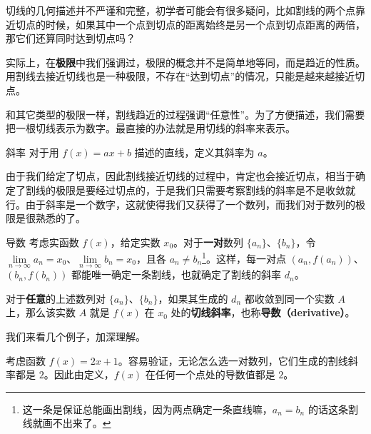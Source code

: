 



切线的几何描述并不严谨和完整，初学者可能会有很多疑问，比如割线的两个点靠近切点的时候，如果其中一个点到切点的距离始终是另一个点到切点距离的两倍，那它们还算同时达到切点吗？

实际上，在\textbf{极限}中我们强调过，极限的概念并不是简单地等同，而是趋近的性质。用割线去接近切线也是一种极限，不存在“达到切点”的情况，只能是越来越接近切点。

和其它类型的极限一样，割线趋近的过程强调“任意性”。为了方便描述，我们需要把一根切线表示为数字。最直接的办法就是用切线的斜率来表示。

\begin{definition}{斜率}
对于用 $f(x)=ax+b$ 描述的直线，定义其斜率为 $a$。
\end{definition}

由于我们给定了切点，因此割线接近切线的过程中，肯定也会接近切点，相当于确定了割线的极限是要经过切点的，于是我们只需要考察割线的斜率是不是收敛就行。由于斜率是一个数字，这就使得我们又获得了一个数列，而我们对于数列的极限是很熟悉的了。

\begin{definition}{导数}\label{def_Der2_1}
考虑实函数 $f(x)$，给定实数 $x_0$。对于\textbf{一对}数列 $\{a_n\}$、$\{b_n\}$，令 $\lim\limits_{n\to\infty}a_n=x_0$、$\lim\limits_{n\to\infty}b_n=x_0$，且各 $a_n\not=b_n$\footnote{这一条是保证总能画出割线，因为两点确定一条直线嘛，$a_n=b_n$ 的话这条割线就画不出来了。}。这样，每一对点 $(a_n, f(a_n))$、$ (b_n, f(b_n))$ 都能唯一确定一条割线，也就确定了割线的斜率 $d_n$。

对于\textbf{任意}的上述数列对 $\{a_n\}$、$\{b_n\}$，如果其生成的 $d_n$ 都收敛到同一个实数 $A$ 上，那么该实数 $A$ 就是 $f(x)$ 在 $x_0$ 处的\textbf{切线斜率}，也称\textbf{导数（derivative）}。
\end{definition}

我们来看几个例子，加深理解。

\begin{example}{}
考虑函数 $f(x)=2x+1$。容易验证，无论怎么选一对数列，它们生成的割线斜率都是 $2$。因此由定义，$f(x)$ 在任何一个点处的导数值都是 $2$。
\end{example}

